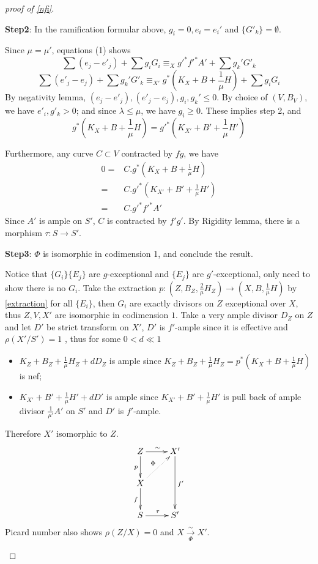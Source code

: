 \documentclass{article}
\begin{document}
\begin{proof}[proof of \ref{nfi}]
\begin{enumerate}
      \textbf{Step2}: In the ramification formular above, $ g_i=0, e_i=e_i' $ and $ \{G'_k\}=\emptyset $.

      Since $ \mu=\mu' $, equations (1) shows
      \[ \sum(e_j-e'_j)+\sum g_iG_i\equiv_X g'^*f'^*A'+\sum g_k'G'_k \]
      \[ \sum(e'_j-e_j)+\sum g_k'G'_k\equiv_{X'} g^*(K_{X}+B+\frac{1}{\mu}H)+\sum g_iG_i \]
      By negativity lemma, $ (e_j-e'_j), (e'_j-e_j), g_i,g_k'\leqslant 0$. By choice of $ (V,B_V) $, we have $ e'_i,g'_k>0 $; and since $\lambda\leqslant\mu$, we have $ g_i\geqslant 0 $. These implies step 2, and 
      \[ g^*(K_{X}+B+\frac{1}{\mu}H)=g'^*(K_{X'}+B'+\frac{1}{\mu}H') \]

      Furthermore, any curve $ C\subset V $ contracted by $ fg $, we have
      \[
        \begin{aligned}
          0=&C.g^*(K_{X}+B+\frac{1}{\mu}H)\\
          =&C.g'^*(K_{X'}+B'+\frac{1}{\mu}H') \\
          =&C.g'^*f'^*A'
        \end{aligned}
      \]
      Since $ A' $ is ample on $ S' $, $ C $ is contracted by $ f'g' $. By Rigidity lemma, there is a morphism $ \tau:S\to S' $.

      \textbf{Step3}: $ \Phi $ is isomorphic in codimension 1, and conclude the result.

      Notice that $ \{G_i\} \{E_j\} $ are $ g $-exceptional and $ \{E_j\} $ are $ g' $-exceptional, only need to show there is no $ G_i $. Take the extraction $ p:(Z,B_Z,\frac{2}{\mu} H_Z)\to (X,B,\frac{1}{\mu} H) $ by \ref{extraction} for all $\{E_{i}\} $, then $ G_i $ are exactly divisors on $ Z $ exceptional over $ X $, thus $ Z,V,X' $ are isomorphic in codimension $ 1 $. Take a very ample divisor $ D_Z $ on $ Z $ and let $ D'  $ be strict transform on $ X' $, $ D' $ is $ f' $-ample since it is effective and $ \rho(X'/S')=1 $ , thus for some $ 0<d\ll1 $ 
      \begin{itemize}
        \item $ K_Z+B_Z+\frac{1}{\mu }H_Z+dD_Z $ is ample since $ K_Z+B_Z+\frac{1}{\mu }H_Z=p^*(K_X+B+\frac{1}{\mu }H) $ is nef;
        \item $ K_{X'}+B'+\frac{1}{\mu }H'+dD' $ is ample since $ K_{X'}+B'+\frac{1}{\mu }H' $ is pull back of ample divisor $ \frac{1}{\mu'}A' $ on $ S' $ and $ D' $ is $ f' $-ample.
      \end{itemize}
      Therefore $ X' $ isomorphic to $ Z $.
      \[ \xymatrix{
          Z\ar[r]^\sim\ar[d]_p&X'\ar[dd]^{f'}\\
          X\ar[d]_f\ar@{.>}[ur]^\Phi&\\
      S\ar[r]^\tau&S' } \]
      Picard number also shows $ \rho(Z/X)=0 $ and $ X\xrightarrow[\Phi]{\sim}X' $.
  \end{enumerate}
\end{proof}
\end{document}
